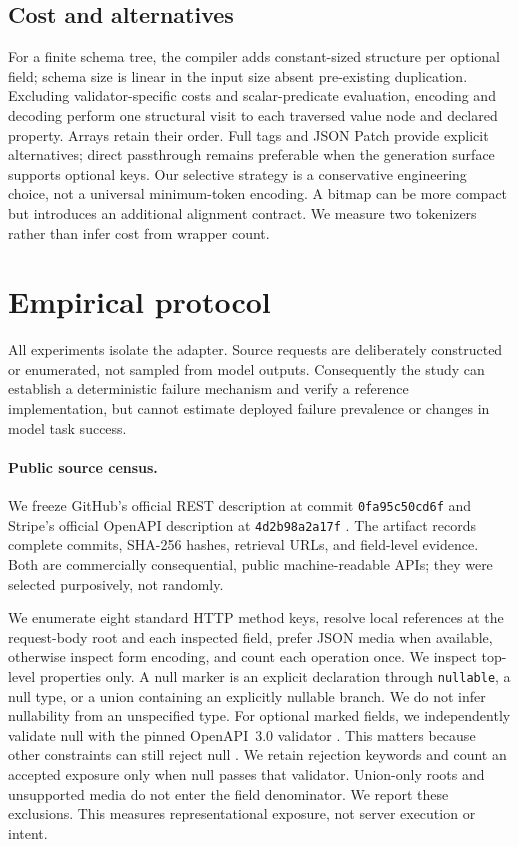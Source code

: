 \documentclass[10pt,twocolumn]{article}
\begin{document}
\subsection{Cost and alternatives}
For a finite schema tree, the compiler adds constant-sized structure per optional field; schema size is linear in the input size absent pre-existing duplication. Excluding validator-specific costs and scalar-predicate evaluation, encoding and decoding perform one structural visit to each traversed value node and declared property. Arrays retain their order. Full tags and JSON Patch provide explicit alternatives; direct passthrough remains preferable when the generation surface supports optional keys. Our selective strategy is a conservative engineering choice, not a universal minimum-token encoding. A bitmap can be more compact but introduces an additional alignment contract. We measure two tokenizers rather than infer cost from wrapper count.

\section{Empirical protocol}
All experiments isolate the adapter. Source requests are deliberately constructed or enumerated, not sampled from model outputs. Consequently the study can establish a deterministic failure mechanism and verify a reference implementation, but cannot estimate deployed failure prevalence or changes in model task success.

\paragraph{Public source census.}
We freeze GitHub's official REST description at commit \texttt{0fa95c50cd6f} and Stripe's official OpenAPI description at \texttt{4d2b98a2a17f} \citep{githubspec,stripespec}. The artifact records complete commits, SHA-256 hashes, retrieval URLs, and field-level evidence. Both are commercially consequential, public machine-readable APIs; they were selected purposively, not randomly.

We enumerate eight standard HTTP method keys, resolve local references at the request-body root and each inspected field, prefer JSON media when available, otherwise inspect form encoding, and count each operation once. We inspect top-level properties only. A null marker is an explicit declaration through \texttt{nullable}, a null type, or a union containing an explicitly nullable branch. We do not infer nullability from an unspecified type. For optional marked fields, we independently validate null with the pinned OpenAPI~3.0 validator \citep{oasvalidator}. This matters because other constraints can still reject null \citep{oas}. We retain rejection keywords and count an accepted exposure only when null passes that validator. Union-only roots and unsupported media do not enter the field denominator. We report these exclusions. This measures representational exposure, not server execution or intent.
\end{document}
